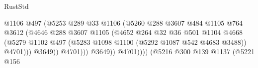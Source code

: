 \begin{lexlean}{RustStd}
\begin{coremodule}
                                                      @1106
                                                      @497
                                                      (@5253
                                                        @289
                                                        @33
                                                        @1106
                                                        (@5260
                                                          @288
                                                          @3607
                                                          @484
                                                          @1105
                                                          @764
                                                          @3612
                                                          (@4646
                                                            @288
                                                            @3607
                                                            @1105
                                                            (@4652
                                                              @264
                                                              @32
                                                              @36
                                                              @501
                                                              @1104
                                                              @4668
                                                              (@5279
                                                                @1102
                                                                @497
                                                                (@5283
                                                                  @1098
                                                                  @1100
                                                                  (@5292 @1087 @542 @4683 @3488))
                                                                @4701)))
                                                          @3649))
                                                      @4701)))
                                                @3649))
                                            @4701))))
                                    (@5216
                                      @300
                                      @139
                                      @1137
                                      (@5221
                                        @156

\end{coremodule}
\end{lexlean}
